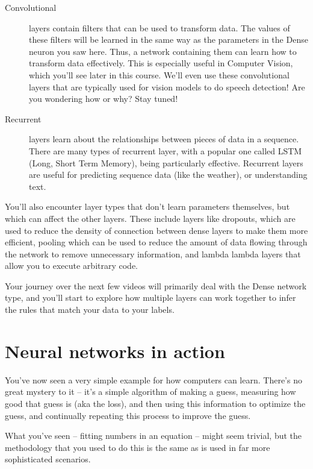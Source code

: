 \begin{description}
  \item[Convolutional] layers contain filters that can be used to transform data. The values of these filters will be learned in the same way as the parameters in the Dense neuron you saw here. Thus, a network containing them can learn how to transform data effectively. This is especially useful in Computer Vision, which you’ll see later in this course. We’ll even use these convolutional layers that are typically used for vision models to do speech detection! Are you wondering how or why? Stay tuned!
  \item [Recurrent] layers learn about the relationships between pieces of data in a sequence. There are many types of recurrent layer, with a popular one called LSTM (Long, Short Term Memory), being particularly effective. Recurrent layers are useful for predicting sequence data (like the weather), or understanding text.
\end{description}

You'll also encounter layer types that don’t learn parameters themselves, but which can affect the other layers. These include layers like dropouts, which are used to reduce the density of connection between dense layers to make them more efficient, pooling which can be used to reduce the amount of data flowing through the network to remove unnecessary information, and lambda lambda layers that allow you to execute arbitrary code.

Your journey over the next few videos will primarily deal with the Dense network type, and you’ll start to explore how multiple layers can work together to infer the rules that match your data to your labels.

\section{Neural networks in action}

You've now seen a very simple example for how computers can learn. There's no great mystery to it -- it's a simple algorithm of making a guess, measuring how good that guess is (aka the loss), and then using this information to optimize the guess, and continually repeating this process to improve the guess.

What you've seen -- fitting numbers in an equation -- might seem trivial, but the methodology that you used to do this is the same as is used in far more sophisticated scenarios.

